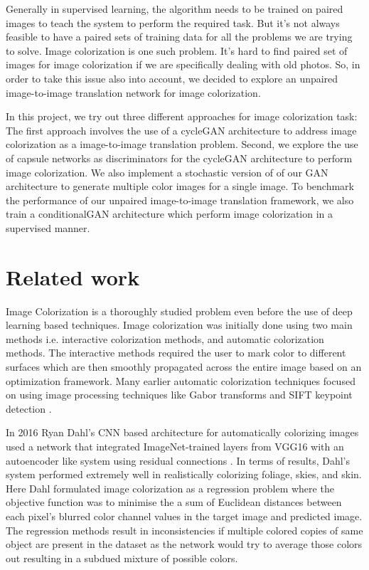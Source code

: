\documentclass{article} %
\begin{document}
Generally in supervised learning, the algorithm needs to be trained on paired images to teach the system to perform the required task. But it's not always feasible to have a paired sets of training data for all the problems we are trying to solve. Image colorization is one such problem. It's hard to find paired set of images for image colorization if we are specifically dealing with old photos. So, in order to  take this issue also into account, we decided to explore an unpaired image-to-image translation network for image colorization. 

In this project, we try out three different approaches for image colorization task: The first approach involves the use of a cycleGAN architecture to address image colorization as a image-to-image translation problem. Second, we explore the use of capsule networks\cite{capsnet} as discriminators for the cycleGAN architecture to perform image colorization. We also implement a stochastic version of of our GAN architecture to generate multiple color images for a single image. To benchmark the performance of our unpaired image-to-image translation framework, we also train a conditionalGAN architecture which perform image colorization in a supervised manner.

\section{Related work}

Image Colorization is a thoroughly studied problem even before the use of deep learning based techniques. Image colorization was initially done using two main methods i.e. interactive colorization methods, and automatic colorization methods\cite{interactive}. The interactive methods required the user to mark color to different surfaces which are then smoothly propagated across the entire image based on an optimization framework. Many earlier automatic colorization techniques focused on using image processing techniques like Gabor transforms and SIFT keypoint detection \cite{gabor}. 

In 2016  Ryan Dahl’s \cite{ryan} CNN based architecture for automatically colorizing images used a network that integrated ImageNet-trained layers from VGG16\cite{vgg} with an autoencoder like system using residual connections \cite{resnet}. In terms of results, Dahl’s system performed extremely well in realistically colorizing foliage, skies, and skin. Here Dahl formulated image colorization as a regression problem where the objective function was to minimise the a sum of Euclidean distances between each pixel’s blurred color channel values in the target image and predicted image. The regression methods result in inconsistencies if multiple colored copies of same object are present in the dataset as the network would try to average those colors out resulting in a subdued mixture of possible colors. 
\end{document}

